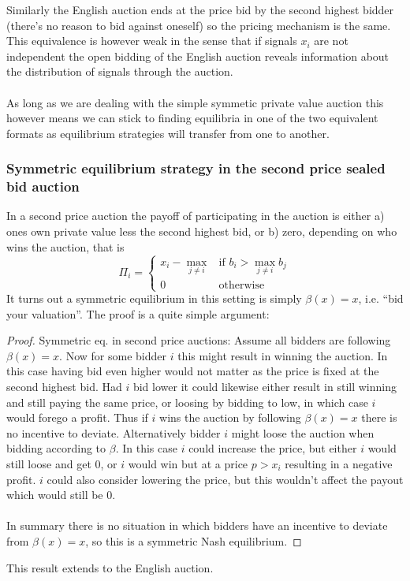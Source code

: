 Similarly the English auction ends at the price bid by the second highest bidder (there's no reason to bid against oneself) so the pricing mechanism is the same. This equivalence is however weak in the sense that if signals $x_i$ are not independent the open bidding of the English auction reveals information about the distribution of signals through the auction.
\\ \\
As long as we are dealing with the simple symmetic private value auction this however means we can stick to finding equilibria in one of the two equivalent formats as equilibrium strategies will transfer from one to another.

\subsubsection{Symmetric equilibrium strategy in the second price sealed bid auction}
In a second price auction the payoff of participating in the auction is either a) ones own private value less the second highest bid, or b) zero, depending on who wins the auction, that is
\begin{equation}
  \Pi_i =
  \begin{cases}
  x_i - {\max}_{j\neq i} & \textrm{if } b_i > \max_{j\neq i} b_j \\
 0 & \textrm{otherwise}
\end{cases}
\end{equation}
It turns out a symmetric equilibrium in this setting is simply $\beta(x) = x$, i.e. ``bid your valuation''. The proof is a quite simple argument:
\begin{proof}{Symmetric eq. in second price auctions:}
Assume all bidders are following $\beta(x)=x$. Now for some bidder $i$ this might result in winning the auction. In this case having bid even higher would not matter as the price is fixed at the second highest bid. Had $i$ bid lower it could likewise either result in still winning and still paying the same price, or loosing by bidding to low, in which case $i$ would forego a profit. Thus if $i$ wins the auction by following $\beta(x)=x$ there is no incentive to deviate. Alternatively bidder $i$ might loose the auction when bidding according to $\beta$. In this case $i$ could increase the price, but either $i$ would still loose and get 0, or $i$ would win but at a price $p>x_i$ resulting in a negative profit. $i$ could also consider lowering the price, but this wouldn't affect the payout which would still be 0.
\\ \\
In summary there is no situation in which bidders have an incentive to deviate from $\beta(x)=x$, so this is a symmetric Nash equilibrium.
\end{proof}
This result extends to the English auction.

